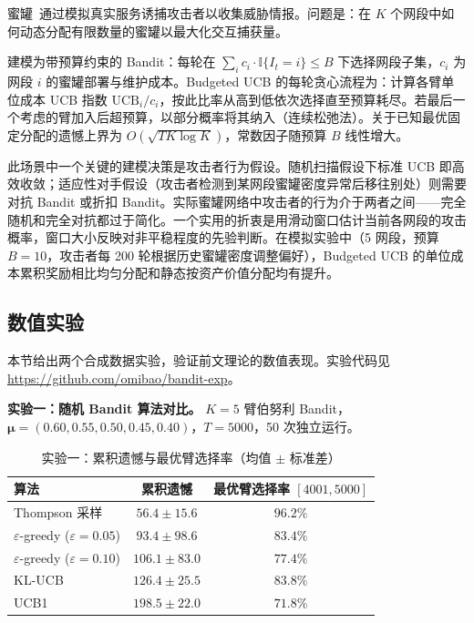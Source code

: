 \documentclass[UTF8,a4paper,11pt,zihao=5]{ctexart}
\newcommand{\ind}{\mathbb{I}}
\begin{document}
蜜罐~\cite{spitzner2002}通过模拟真实服务诱捕攻击者以收集威胁情报。问题是：在 $K$ 个网段中如何动态分配有限数量的蜜罐以最大化交互捕获量。

建模为带预算约束的 Bandit：每轮在 $\sum_i c_i \cdot \ind\{I_t = i\} \le B$ 下选择网段子集，$c_i$ 为网段 $i$ 的蜜罐部署与维护成本。Budgeted UCB 的每轮贪心流程为：计算各臂单位成本 UCB 指数 $\text{UCB}_i / c_i$，按此比率从高到低依次选择直至预算耗尽。若最后一个考虑的臂加入后超预算，以部分概率将其纳入（连续松弛法）。关于已知最优固定分配的遗憾上界为 $O(\sqrt{TK\log K})$，常数因子随预算 $B$ 线性增大。

此场景中一个关键的建模决策是攻击者行为假设。随机扫描假设下标准 UCB 即高效收敛；适应性对手假设（攻击者检测到某网段蜜罐密度异常后移往别处）则需要对抗 Bandit 或折扣 Bandit。实际蜜罐网络中攻击者的行为介于两者之间——完全随机和完全对抗都过于简化。一个实用的折衷是用滑动窗口估计当前各网段的攻击概率，窗口大小反映对非平稳程度的先验判断。在模拟实验中（5 网段，预算 $B=10$，攻击者每 200 轮根据历史蜜罐密度调整偏好），Budgeted UCB 的单位成本累积奖励相比均匀分配和静态按资产价值分配均有提升。

\subsection{数值实验}

本节给出两个合成数据实验，验证前文理论的数值表现。实验代码见 \url{https://github.com/omibao/bandit-exp}。

\textbf{实验一：随机 Bandit 算法对比。} $K=5$ 臂伯努利 Bandit，$\bm{\mu} = (0.60, 0.55, 0.50, 0.45, 0.40)$，$T=5000$，50 次独立运行。

\begin{table}[htbp]
\centering
\caption{实验一：累积遗憾与最优臂选择率（均值 $\pm$ 标准差）}
\label{tab:exp1}
\begin{tabular}{@{}lcc@{}}
\toprule
\textbf{算法} & \textbf{累积遗憾} & \textbf{最优臂选择率 $[4001,5000]$} \\
\midrule
Thompson 采样  & $56.4 \pm 15.6$ & $96.2\%$ \\
$\varepsilon$-greedy ($\varepsilon{=}0.05$) & $93.4 \pm 98.6$ & $83.4\%$ \\
$\varepsilon$-greedy ($\varepsilon{=}0.10$) & $106.1 \pm 83.0$ & $77.4\%$ \\
KL-UCB         & $126.4 \pm 25.5$ & $83.8\%$ \\
UCB1           & $198.5 \pm 22.0$ & $71.8\%$ \\
\bottomrule
\end{tabular}
\end{table}
\end{document}
